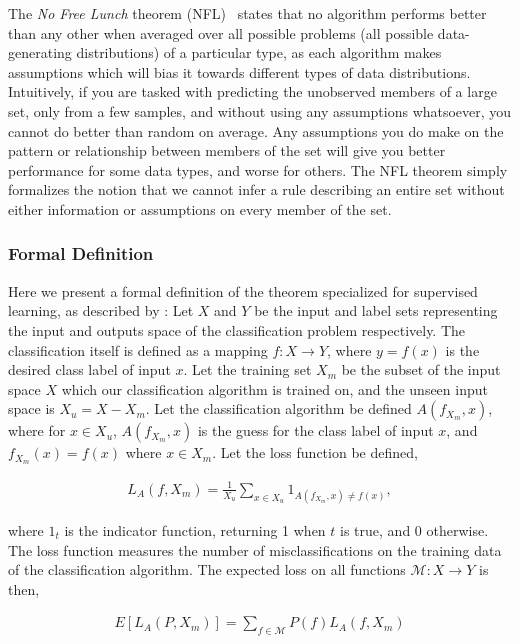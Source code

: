 \documentclass[thesis]{subfiles}
\begin{document}
The \emph{No Free Lunch} theorem (NFL)~\citep{wolpert1996lack} states that no algorithm performs better than any other when averaged over all possible problems (\ie all possible data-generating distributions) of a particular type, as each algorithm makes assumptions which will bias it towards different types of data distributions. Intuitively, if you are tasked with predicting the unobserved members of a large set, only from a few samples, and without using any assumptions whatsoever, you cannot do better than random on average. Any assumptions you do make on the pattern or relationship between members of the set will give you better performance for some data types, and worse for others. The NFL theorem simply formalizes the notion that we cannot infer a rule describing an entire set without either information or assumptions on every member of the set.

\subsubsection{Formal Definition}
Here we present a formal definition of the theorem specialized for supervised learning, as described by \citet{lattimore2013no}: Let $X$ and $Y$ be the input and label sets representing the input and outputs space of the classification problem respectively. The classification itself is defined as a mapping $f: X \to Y$, where $y=f(x)$ is the desired class label of input $x$. Let the training set $X_m$ be the subset of the input space $X$ which our classification algorithm is trained on, and the unseen input space is $X_u = X - X_m$. Let the classification algorithm be defined $A(f_{X_{m}}, x)$, where for $x \in X_u$, $A(f_{X_{m}}, x)$ is the guess for the class label of input $x$, and $f_{X_{m}}(x) = f(x)$ where $x\in X_m$. Let the loss function be defined,

\begin{align}
    L_A(f, X_m) = \frac{1}{X_u} \sum_{x\in X_u} 1_{A(f_{X_m}, x) \neq f(x)},
\end{align}

where $1_{t}$ is the indicator function, returning 1 when $t$ is true, and 0 otherwise. The loss function measures the number of misclassifications on the training data of the classification algorithm. The expected loss on all functions $\mathcal{M}: X \to Y$ is then,

\begin{align}
    E\left[ L_A\left(P, X_m\right) \right] = \sum_{f\in \mathcal{M}} P(f)L_A(f, X_m)
\end{align} 
\end{document}
